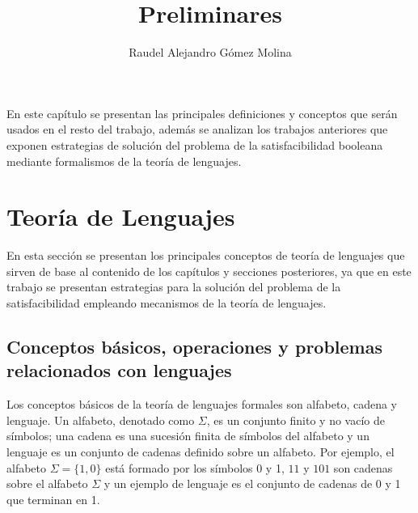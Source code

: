 \documentclass[12pt]{article}
\title{Preliminares}
\author{Raudel Alejandro Gómez Molina}
\begin{document}
\maketitle





En este capítulo se presentan las principales definiciones y conceptos que serán usados en el resto del trabajo, además
se analizan los trabajos anteriores que exponen estrategias de solución del problema de la satisfacibilidad
booleana  mediante formalismos de la teoría de lenguajes.

\section{Teoría de Lenguajes}

En esta sección se presentan los principales conceptos de teoría de lenguajes que sirven de base al contenido de los 
capítulos y secciones posteriores, ya que en este trabajo se presentan estrategias para la solución del problema
de la satisfacibilidad empleando mecanismos de la teoría de lenguajes.

\subsection{Conceptos básicos, operaciones y problemas relacionados con lenguajes}

Los conceptos básicos de la teoría de lenguajes formales son alfabeto, cadena y lenguaje. Un alfabeto, denotado 
como $\Sigma$, es un conjunto finito y no vacío de símbolos; una cadena es una sucesión finita de símbolos del alfabeto y 
un lenguaje es un conjunto de cadenas definido sobre un alfabeto. Por ejemplo, el 
alfabeto $\Sigma=\{1,0\}$ está formado por los símbolos 0 y 1, $11$ y $101$ son cadenas sobre el alfabeto $\Sigma$ y un ejemplo de lenguaje
es  el conjunto de cadenas de 0 y 1 que terminan en 1.
\end{document}
